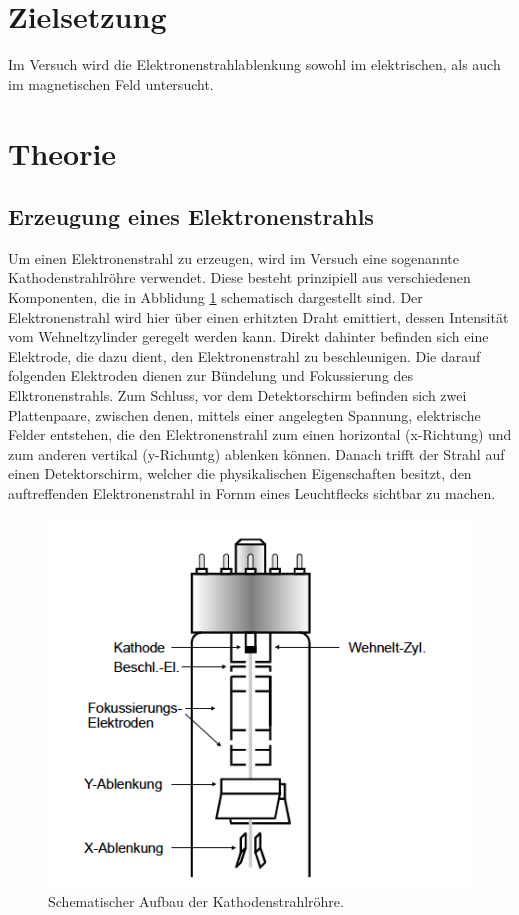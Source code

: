 \section{Zielsetzung}
Im Versuch wird die Elektronenstrahlablenkung sowohl im elektrischen, als auch im
magnetischen Feld untersucht.

\section{Theorie}
\subsection{Erzeugung eines Elektronenstrahls}
Um einen Elektronenstrahl zu erzeugen, wird im Versuch eine sogenannte Kathodenstrahlröhre
verwendet. Diese besteht prinzipiell aus verschiedenen Komponenten, die in Abblidung \ref{abb1}
schematisch dargestellt sind. Der Elektronenstrahl wird hier über einen erhitzten Draht emittiert,
dessen Intensität vom Wehneltzylinder geregelt werden kann. Direkt dahinter befinden sich
eine Elektrode, die dazu dient, den Elektronenstrahl zu beschleunigen. Die darauf folgenden
Elektroden dienen zur Bündelung und Fokussierung des Elktronenstrahls. Zum Schluss,
vor dem Detektorschirm befinden sich zwei Plattenpaare, zwischen denen, mittels einer angelegten
Spannung, elektrische Felder entstehen, die den Elektronenstrahl zum einen horizontal (x-Richtung) und
zum anderen vertikal (y-Richuntg) ablenken können. Danach trifft der Strahl auf einen Detektorschirm, welcher
die physikalischen Eigenschaften besitzt, den auftreffenden Elektronenstrahl in Fornm eines
Leuchtflecks sichtbar zu machen.
\FloatBarrier
\begin{figure}
  \centering
  \includegraphics[scale=0.5]{kanone.PNG}
  \caption{Schematischer Aufbau der Kathodenstrahlröhre. \cite{Q1}}
  \label{abb1}
\end{figure}
\FloatBarrier
